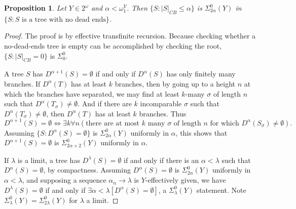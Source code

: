 \documentclass[12pt]{amsart}
\newtheorem{prop}[theorem]{Proposition}
\begin{document}
\begin{prop}
Let $Y \in 2^\omega$ and $\alpha < \omega_1^Y$.  Then $\{S : |S|_{CB} \leq \alpha\}$ 
is $\Sigma^0_{2\alpha}(Y)$ in $\{S : S \text{ is a tree with no dead ends}\}$.
\end{prop}

\begin{proof}
The proof is by effective transfinite recursion.  
Because checking whether a no-dead-ends
tree is empty can be accomplished by checking the root, 
$\{ S : |S|_{CB} = 0\}$ is $\Sigma^0_0$.

A tree $S$ has $D^{\alpha+1}(S) = \emptyset$ if and only if 
$D^\alpha(S)$ has only finitely many branches.
If $D^\alpha(T)$ has at least $k$ branches, then by going up to a height $n$ at which the branches have separated, we may find at least $k$-many $\sigma$ of length $n$ such that $D^\alpha(T_\sigma) \neq \emptyset$.  And if there are $k$ incomparable $\sigma$ such that $D^\alpha(T_\sigma)\neq \emptyset$, then $D^\alpha(T)$ has at least $k$ branches.  Thus
$$D^{\alpha+1}(S) = \emptyset \iff \exists k \forall n (\text{there are at most $k$ many $\sigma$ of length $n$ for which } D^\alpha(S_\sigma) \neq \emptyset).$$    
Assuming $\{S : D^\alpha(S)=\emptyset\}$ is $\Sigma^0_{2\alpha}(Y)$ uniformly in $\alpha$, 
this shows that $D^{\alpha+1}(S)=\emptyset$ is $\Sigma^0_{2\alpha+2}(Y)$ uniformly
in $\alpha$.

If $\lambda$ is a limit, a tree has $D^{\lambda}(S) = \emptyset$ if and only if there is an $\alpha<\lambda$ such that $D^\alpha(S) = \emptyset$, by compactness.  Assuming $D^{\alpha}(S) = \emptyset$ is $\Sigma^0_{2\alpha}(Y)$ 
uniformly in $\alpha < \lambda$, and supposing a sequence
$\alpha_n\rightarrow \lambda$ is $Y$-effectively given, 
we have $D^\lambda(S) = \emptyset$ if and only if $\exists \alpha < \lambda[D^\alpha(S)=\emptyset]$, a $\Sigma^0_\lambda(Y)$ statement.  Note $\Sigma^0_\lambda(Y) =\Sigma^0_{2\lambda}(Y)$ for $\lambda$ a limit.
\end{proof}
\end{document}
